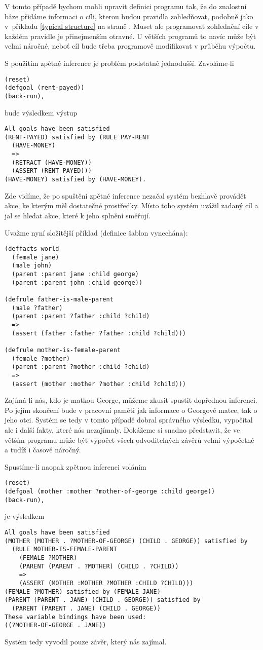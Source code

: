 V tomto případě bychom mohli upravit definici programu tak, že do znalostní báze
přidáme informaci o cíli, kterou budou pravidla zohledňovat, podobně jako
v~příkladu \ref{typical structure} na straně \pageref{typical structure}. Muset
ale programovat zohlednění cíle v každém pravidle je přinejmenším otravné. U
větších programů to navíc může být velmi náročné, neboť cíl bude třeba
programově modifikovat v průběhu výpočtu.

S použitím zpětné inference je problém podstatně jednodušší. Zavoláme-li
\begin{verbatim}
(reset)
(defgoal (rent-payed))
(back-run),
\end{verbatim}
bude výsledkem výstup
\begin{verbatim}
All goals have been satisfied
(RENT-PAYED) satisfied by (RULE PAY-RENT
  (HAVE-MONEY)
  =>
  (RETRACT (HAVE-MONEY))
  (ASSERT (RENT-PAYED)))
(HAVE-MONEY) satisfied by (HAVE-MONEY).
\end{verbatim}
Zde vidíme, že po spuštění zpětné inference nezačal systém bezhlavě provádět
akce, ke kterým měl dostatečné prostředky. Místo toho systém uvážil zadaný cíl a
jal se hledat akce, které k jeho splnění směřují.

Uvažme nyní složitější příklad (definice šablon vynechána):
\begin{verbatim}
(deffacts world
  (female jane)
  (male john)
  (parent :parent jane :child george)
  (parent :parent john :child george))

(defrule father-is-male-parent
  (male ?father)
  (parent :parent ?father :child ?child)
  =>
  (assert (father :father ?father :child ?child)))

(defrule mother-is-female-parent
  (female ?mother)
  (parent :parent ?mother :child ?child)
  =>
  (assert (mother :mother ?mother :child ?child)))
\end{verbatim}
Zajímá-li nás, kdo je matkou George, můžeme zkusit spustit dopřednou inferenci.
Po jejím skončení bude v pracovní paměti jak informace o Georgově matce, tak o
jeho otci. Systém se tedy v tomto případě dobral správného výsledku, vypočítal
ale i další fakty, které nás nezajímaly. Dokážeme si snadno představit, že ve
větším programu může být výpočet všech odvoditelných závěrů velmi výpočetně
a tudíž i časově náročný.

Spustíme-li naopak zpětnou inferenci voláním
\begin{verbatim}
(reset)
(defgoal (mother :mother ?mother-of-george :child george))
(back-run),
\end{verbatim}
je výsledkem
\begin{verbatim}
All goals have been satisfied
(MOTHER (MOTHER . ?MOTHER-OF-GEORGE) (CHILD . GEORGE)) satisfied by
  (RULE MOTHER-IS-FEMALE-PARENT
    (FEMALE ?MOTHER)
    (PARENT (PARENT . ?MOTHER) (CHILD . ?CHILD))
    =>
    (ASSERT (MOTHER :MOTHER ?MOTHER :CHILD ?CHILD)))
(FEMALE ?MOTHER) satisfied by (FEMALE JANE)
(PARENT (PARENT . JANE) (CHILD . GEORGE)) satisfied by
  (PARENT (PARENT . JANE) (CHILD . GEORGE))
These variable bindings have been used:
((?MOTHER-OF-GEORGE . JANE))
\end{verbatim}
Systém tedy vyvodil pouze závěr, který nás zajímal.

